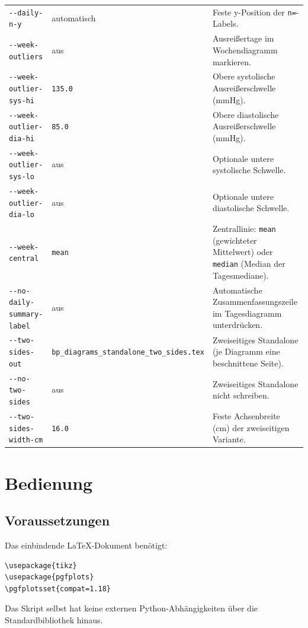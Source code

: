 \documentclass[conference]{IEEEtran}
\newcommand{\param}[1]{\texttt{#1}}
\begin{document}
\begin{table}[!t]
\begin{tabular}{>{\raggedright\arraybackslash}p{} >{\raggedright\arraybackslash}p{} >{\raggedright\arraybackslash}p{}}
\param{-{}-daily-n-y} & automatisch & Feste y-Position der \texttt{n=}-Labels. \\
\param{-{}-week-outliers} & aus & Ausreißertage im Wochendiagramm markieren. \\
\param{-{}-week-outlier-sys-hi} & \texttt{135.0} & Obere systolische Ausreißerschwelle (mmHg). \\
\param{-{}-week-outlier-dia-hi} & \texttt{85.0} & Obere diastolische Ausreißerschwelle (mmHg). \\
\param{-{}-week-outlier-sys-lo} & aus & Optionale untere systolische Schwelle. \\
\param{-{}-week-outlier-dia-lo} & aus & Optionale untere diastolische Schwelle. \\
\param{-{}-week-central} & \texttt{mean} & Zentrallinie: \texttt{mean} (gewichteter Mittelwert) oder \texttt{median} (Median der Tagesmediane). \\
\param{-{}-no-daily-summary-label} & aus & Automatische Zusammenfassungszeile im Tagesdiagramm unterdrücken. \\
\param{-{}-two-sides-out} & \texttt{bp\_\hspace{0pt}diagrams\_\hspace{0pt}standalone\_\hspace{0pt}two\_\hspace{0pt}sides.tex} & Zweiseitiges Standalone (je Diagramm eine beschnittene Seite). \\
\param{-{}-no-two-sides} & aus & Zweiseitiges Standalone nicht schreiben. \\
\param{-{}-two-sides-width-cm} & \texttt{16.0} & Feste Achsenbreite (cm) der zweiseitigen Variante. \\
\bottomrule
\end{tabular}
\end{table}

\section{Bedienung}
\subsection{Voraussetzungen}
Das einbindende LaTeX-Dokument benötigt:
\begin{lstlisting}[style=sh]
\usepackage{tikz}
\usepackage{pgfplots}
\pgfplotsset{compat=1.18}
\end{lstlisting}
Das Skript selbst hat keine externen Python-Abhängigkeiten über die
Standardbibliothek hinaus.
\end{document}
